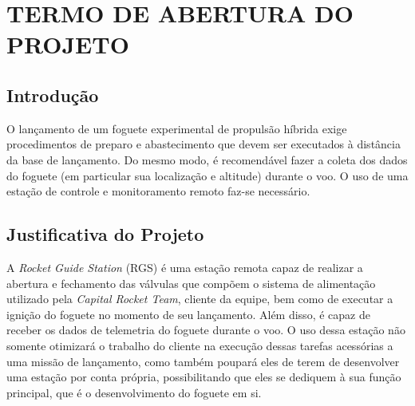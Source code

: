 \chapter{TERMO DE ABERTURA DO PROJETO}
\section{Introdução}
O lançamento de um foguete experimental de propulsão híbrida exige procedimentos de preparo e abastecimento que devem ser executados à distância da base de lançamento. Do mesmo modo, é recomendável fazer a coleta dos dados do foguete (em particular sua localização e altitude) durante o voo. O uso de uma estação de controle e monitoramento remoto faz-se necessário.

\section{Justificativa do Projeto}
A \textit{Rocket Guide Station} (RGS) é uma estação remota capaz de realizar a abertura e fechamento das válvulas que compõem o sistema de alimentação utilizado pela \textit{Capital Rocket Team}, cliente da equipe, bem como de executar a ignição do foguete no momento de seu lançamento. Além disso, é capaz de receber os dados de telemetria do foguete durante o voo. O uso dessa estação não somente otimizará o trabalho do cliente na execução dessas tarefas acessórias a uma missão de lançamento, como também poupará eles de terem de desenvolver uma estação por conta própria, possibilitando que eles se dediquem à sua função principal, que é o desenvolvimento do foguete em si.












